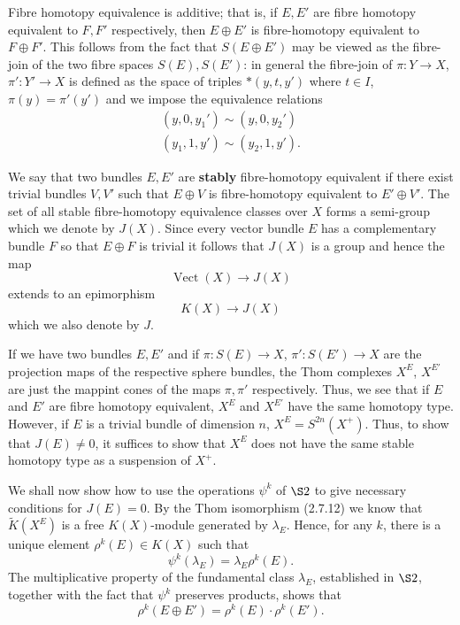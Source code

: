 \documentclass[leqno]{book}
\numberwithin{equation}{section}
\theoremstyle{definition}
\renewcommand{\emph}{\textbf}
\begin{document}
            Fibre homotopy equivalence is additive; that is, if $E, E'$ are fibre homotopy equivalent to $F, F'$ respectively, then $E\oplus E'$ is fibre-homotopy equivalent to $F\oplus F'$. This follows from the fact that $S(E\oplus E')$ may be viewed as the fibre-join of the two fibre spaces $S(E),S(E')$: in general the fibre-join of $\pi:Y\to X$, $\pi':Y'\to X$ is defined as the space of triples $*(y,t,y')$ where $t\in I$, $\pi(y)=\pi'(y')$ and we impose the equivalence relations
            \begin{equation*}
              \begin{aligned}
                (y,0,y_1')\sim (y,0,y_2')  \\
                (y_1,1,y')\sim (y_2,1,y').
              \end{aligned}
            \end{equation*}

            We say that two bundles $E,E'$ are \emph{stably} fibre-homotopy equivalent if there exist trivial bundles $V,V'$ such that $E\oplus V$ is fibre-homotopy equivalent to $E'\oplus V'$. The set of all stable fibre-homotopy equivalence classes over $X$ forms a semi-group which we denote by $J(X)$. Since every vector bundle $E$ has a complementary bundle $F$ so that $E\oplus F$ is trivial it follows that $J(X)$ is a group and hence the map
            \begin{equation*}
              \operatorname{Vect}(X)\to J(X)
            \end{equation*}
            extends to an epimorphism
            \begin{equation*}
              K(X)\to J(X)
            \end{equation*}
            which we also denote by $J$.

            If we have two bundles $E,E'$ and if $\pi:S(E)\to X$, $\pi':S(E')\to X$ are the projection maps of the respective sphere bundles, the Thom complexes $X^{E}$, $X^{E'}$ are just the mappint cones of the maps $\pi,\pi'$ respectively. Thus, we see that if $E$ and $E'$ are fibre homotopy equivalent, $X^{E}$ and $X^{E'}$ have the same homotopy type. However, if $E$ is a trivial bundle of dimension $n$, $X^{E}=S^{2n}(X^{+})$. Thus, to show that $J(E)\neq 0$, it suffices to show that $X^{E}$ does not have the same stable homotopy type as a suspension of $X^{+}$.

            We shall now show how to use the operations $\psi^{k}$ of $\S 2$ to give necessary conditions for $J(E)=0$. By the Thom isomorphism (2.7.12) we know that $\tilde{K}(X^{E})$ is a free $K(X)$-module generated by $\lambda_{E}$. Hence, for any $k$, there is a unique element $\rho^{k}(E)\in K(X)$ such that 
            \begin{equation*}
              \psi^{k}(\lambda_{E})=\lambda_{E}\rho^{k}(E).
            \end{equation*}
            The multiplicative property of the fundamental class $\lambda _{E}$, established in $\S 2$, together with the fact that $\psi^{k}$ preserves products, shows that
            \begin{equation*}
              \rho^{k}(E\oplus  E')=\rho^{k}(E)\cdot \rho^{k}(E').
            \end{equation*}
\end{document}
